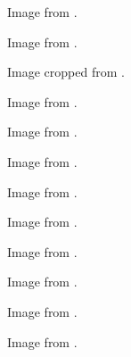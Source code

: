 	\begin{minipage}{\textwidth}
		Image from \cite{coldCuts}.
	\end{minipage}

	\begin{minipage}{\textwidth}
		Image from \cite{tomato}.
	\end{minipage}

	\begin{minipage}{\textwidth}
		Image cropped from \cite{cheese}.
	\end{minipage}

	\begin{minipage}{\textwidth}
		Image from \cite{lettuce}.
	\end{minipage}

	\begin{minipage}{\textwidth}
		Image from \cite{mayonnaise}.
	\end{minipage}

	\begin{minipage}{\textwidth}
		Image from \cite{mustard}.
	\end{minipage}

	\begin{minipage}{\textwidth}
		Image from \cite{ketchup}.
	\end{minipage}

	\begin{minipage}{\textwidth}
		Image from \cite{carrot}.
	\end{minipage}

	\begin{minipage}{\textwidth}
		Image from \cite{peanutButter}.
	\end{minipage}

	\begin{minipage}{\textwidth}
		Image from \cite{jelly}.
	\end{minipage}

	\begin{minipage}{\textwidth}
		Image from \cite{olives}.
	\end{minipage}

	\begin{minipage}{\textwidth}
		Image from \cite{fish}.
	\end{minipage}

